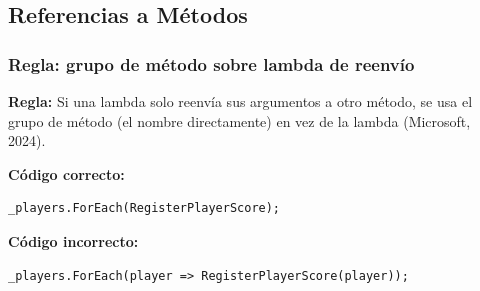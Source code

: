 \subsection{Referencias a Métodos}

\subsubsection{Regla: grupo de método sobre lambda de reenvío}

\textbf{Regla:} Si una lambda solo reenvía sus argumentos a otro método, se usa el grupo de método (el nombre directamente) en vez de la lambda (Microsoft, 2024).

\textbf{Código correcto:}
\begin{lstlisting}[style=csharpstyle]
_players.ForEach(RegisterPlayerScore);
\end{lstlisting}

\textbf{Código incorrecto:}
\begin{lstlisting}[style=csharpstyle]
_players.ForEach(player => RegisterPlayerScore(player));
\end{lstlisting}
